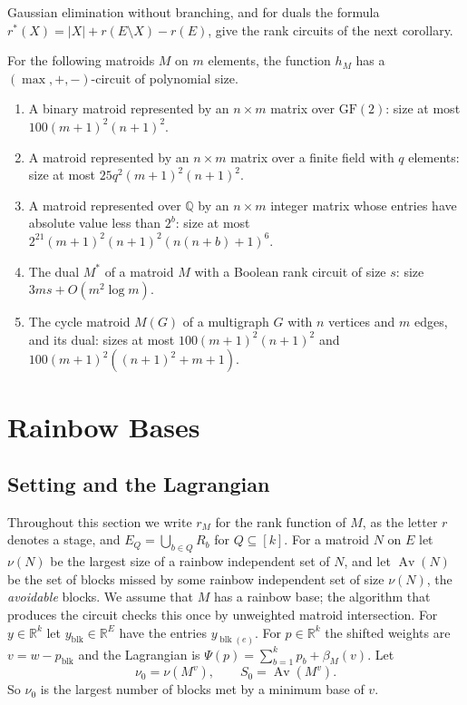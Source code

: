 \documentclass[runningheads,envcountsame]{llncs}
\newcommand{\R}{\mathbb R}
\newcommand{\blk}{\operatorname{blk}}
\newcommand{\Av}{\operatorname{Av}}
\begin{document}
Gaussian elimination without branching, and for duals the formula
$r^{*}(X)=|X|+r(E\setminus X)-r(E)$, give the rank circuits of the next corollary.

\begin{corollary}
\label{cor:classes}
For the following matroids $M$ on $m$ elements, the function $h_M$ has a $(\max,+,-)$-circuit of polynomial size.
\begin{enumerate}
  \item A binary matroid represented by an $n\times m$ matrix over
        $\mathrm{GF}(2)$: size at most $100(m+1)^{2}(n+1)^{2}$.
  \item A matroid represented by an $n\times m$ matrix over a finite field with
        $q$ elements: size at most $25q^{2}(m+1)^{2}(n+1)^{2}$.
  \item A matroid represented over $\mathbb Q$ by an $n\times m$ integer matrix
        whose entries have absolute value less than $2^{b}$: size at most
        $2^{21}(m+1)^{2}(n+1)^{2}(n(n+b)+1)^{6}$.
  \item The dual $M^{*}$ of a matroid $M$ with a Boolean rank circuit of size
        $s$: size $3ms+O(m^{2}\log m)$.
  \item The cycle matroid $M(G)$ of a multigraph $G$ with $n$ vertices and $m$
        edges, and its dual: sizes at most $100(m+1)^{2}(n+1)^{2}$ and
        $100(m+1)^{2}((n+1)^{2}+m+1)$.
\end{enumerate}
\end{corollary}

\section{Rainbow Bases}
\label{sec:rainbow}

\subsection{Setting and the Lagrangian}
\label{sec:lagr}

Throughout this section we write $r_M$ for the rank function of $M$, as the letter
$r$ denotes a stage, and $E_Q=\bigcup_{b\in Q}R_b$ for $Q\subseteq[k]$.  For a
matroid $N$ on $E$ let $\nu(N)$ be the
largest size of a rainbow independent set of $N$, and let $\Av(N)$ be the set of
blocks missed by some rainbow independent set of size $\nu(N)$, the
\emph{avoidable} blocks.  We assume that $M$ has a rainbow base; the algorithm
that produces the circuit checks this once by unweighted matroid intersection.  For
$y\in\R^{k}$ let $y_{\blk}\in\R^{E}$ have the entries $y_{\blk(e)}$.  For
$p\in\R^{k}$ the shifted weights are $v=w-p_{\blk}$ and the Lagrangian is
$\Psi(p)=\sum_{b=1}^{k}p_b+\beta_M(v)$.  Let
\[
  \nu_0=\nu(M^{v}),\qquad S_0=\Av(M^{v}).
\]
So $\nu_0$ is the largest number of blocks met by a minimum base of $v$.
\end{document}
